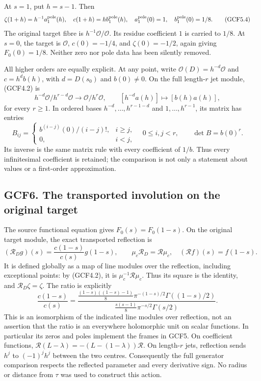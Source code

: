 At \(s=1\), put \(h=s-1\). Then \[
\zeta(1+h)=h^{-1}a_1^{\rm pole}(h),\quad
c(1+h)=h b_1^{\rm pole}(h),\quad
a_1^{\rm pole}(0)=1,\quad b_1^{\rm pole}(0)=1/8.
\tag{GCF5.4}
\] The original target fibre is \(h^{-1}\mathcal O/\mathcal O\). Its
residue coefficient \(1\) is carried to \(1/8\). At \(s=0\), the target
is \(\mathcal O\), \(c(0)=-1/4\), and \(\zeta(0)=-1/2\), again giving
\(F_0(0)=1/8\). Neither zero nor pole data has been silently removed.

All higher orders are equally explicit. At any point, write
\(\mathcal O(D)=h^{-d}\mathcal O\) and \(c=h^d b(h)\), with \(d=D(s_0)\)
and \(b(0)\ne0\). On the full length-\(r\) jet module, (GCF4.2) is \[
h^{-d}\mathcal O/h^{r-d}\mathcal O\longrightarrow
\mathcal O/h^r\mathcal O,
\qquad [h^{-d}a(h)]\longmapsto[b(h)a(h)],
\tag{GCF5.5}
\] for every \(r\ge1\). In ordered bases \(h^{-d},\ldots,h^{r-1-d}\) and
\(1,\ldots,h^{r-1}\), its matrix has entries \[
B_{ij}=\begin{cases}b^{(i-j)}(0)/(i-j)!,&i\ge j,\\0,&i<j,\end{cases}
\quad 0\le i,j<r,\qquad \det B=b(0)^r.
\tag{GCF5.6}
\] Its inverse is the same matrix rule with every coefficient of
\(1/b\). Thus every infinitesimal coefficient is retained; the
comparison is not only a statement about values or a first-order
approximation.

\subsection{GCF6. The transported involution on the original
target}\label{gcf6.-the-transported-involution-on-the-original-target}

The source functional equation gives \(F_0(s)=F_0(1-s)\). On the
original target module, the exact transported reflection is \[
(\mathscr R_Dg)(s)=\frac{c(1-s)}{c(s)}g(1-s),
\qquad \mu_c\mathscr R_D=\mathscr R\mu_c,
\quad (\mathscr Rf)(s)=f(1-s).
\tag{GCF6.1}
\] It is defined globally as a map of line modules over the reflection,
including exceptional points: by (GCF4.2), it is
\(\mu_c^{-1}\mathscr R\mu_c\). Thus its square is the identity, and
\(\mathscr R_D\zeta=\zeta\). The ratio is explicitly \[
\frac{c(1-s)}{c(s)}=
\frac{\frac{(1-s)((1-s)-1)}8\pi^{-(1-s)/2}\Gamma((1-s)/2)}
{\frac{s(s-1)}8\pi^{-s/2}\Gamma(s/2)}.
\tag{GCF6.2}
\] This is an isomorphism of the indicated line modules over reflection,
not an assertion that the ratio is an everywhere holomorphic unit on
scalar functions. In particular its zeros and poles implement the frames
in GCF5. On coefficient functions,
\(\mathscr R(L-\lambda)=-(L-(1-\lambda))\mathscr R\). On length-\(r\)
jets, reflection sends \(h^j\) to \((-1)^jh^j\) between the two centres.
Consequently the full generator comparison respects the reflected
parameter and every derivative sign. No radius or distance from \(\tau\)
was used to construct this action.

